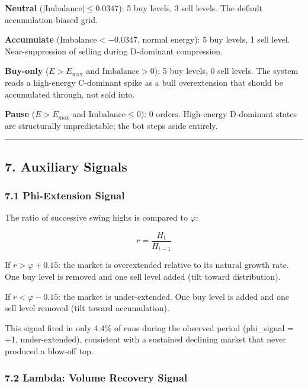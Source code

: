 \documentclass[
  11pt,
  letterpaper,
]{article}
\begin{document}
\textbf{Neutral} (\(|\text{Imbalance}| \leq 0.0347\)): 5 buy levels, 3
sell levels. The default accumulation-biased grid.

\textbf{Accumulate} (\(\text{Imbalance} < -0.0347\), normal energy): 5
buy levels, 1 sell level. Near-suppression of selling during D-dominant
compression.

\textbf{Buy-only} (\(E > E_{\text{max}}\) and \(\text{Imbalance} > 0\)):
5 buy levels, 0 sell levels. The system reads a high-energy C-dominant
spike as a bull overextension that should be accumulated through, not
sold into.

\textbf{Pause} (\(E > E_{\text{max}}\) and \(\text{Imbalance} \leq 0\)):
0 orders. High-energy D-dominant states are structurally unpredictable;
the bot steps aside entirely.

\begin{center}\rule{0.5\linewidth}{0.5pt}\end{center}

\subsection{7. Auxiliary Signals}\label{auxiliary-signals}

\subsubsection{7.1 Phi-Extension Signal}\label{phi-extension-signal}

The ratio of successive swing highs is compared to \(\varphi\):

\[r = \frac{H_{t}}{H_{t-1}}\]

If \(r > \varphi + 0.15\): the market is overextended relative to its
natural growth rate. One buy level is removed and one sell level added
(tilt toward distribution).

If \(r < \varphi - 0.15\): the market is under-extended. One buy level
is added and one sell level removed (tilt toward accumulation).

This signal fired in only 4.4\% of runs during the observed period
(phi\_signal = +1, under-extended), consistent with a sustained
declining market that never produced a blow-off top.

\subsubsection{7.2 Lambda: Volume Recovery
Signal}\label{lambda-volume-recovery-signal}
\end{document}
